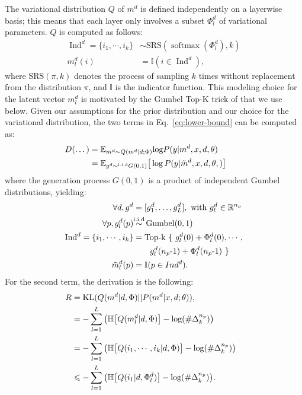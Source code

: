 \documentclass[11pt]{article}
\newcommand{\fyDone}[1]{\done[FY]\Todo[FY:]{\textcolor{orange}{#1}}}
\begin{document}
The variational distribution $Q$ of $m^d$ is defined independently on a layerwise basis; this means that each layer only involves a subset $\Phi_l^d$ of variational parameters. $Q$ is computed as follows:
\begin{align}
  \operatorname{Ind}^d = \{ i_1, \cdots, i_k \} & \sim \text{SRS}(\operatorname{softmax}(\Phi_l^d), k) \nonumber \\
  m_l^d(i) & =  \text{$\mathbb{I}$}(i \in \operatorname{Ind}^d), \nonumber
\end{align}
where $\text{SRS}(\pi,k)$ denotes the process of sampling $k$ times without replacement from the distribution $\pi$, and $\mathbb{I}$ is the indicator function. This modeling choice for the latent vector $m_l^d$ is motivated by the Gumbel Top-K trick of \citet{Kool19stochastic} that we use below.  Given our assumptions for the prior distribution and our choice for the variational distribution, the two terms in Eq.~\eqref{eq:lower-bound} can be computed as:
\begin{align}
\hspace{-2.em}
D(\dots) &= \mathbb{E}_{m^d \sim Q(m^d | d; \Phi)} \text{log} P(y | m^d, x, d, \theta) \nonumber \\
&= \mathbb{E}_{g^d \sim^{\text{i.i.d}} G(0,1)} \big[ \log P(y |\tilde{m}^d, x, d, \theta,) \big] \nonumber
\end{align}
where the generation process $G(0,1)$ is a product of independent Gumbel distributions, yielding:
\begin{align}
  \hspace{-2.em}
  \forall d,  g^d & =  [g_1^d, \dots, g_L^d],  \text{ with } g_l^d \in \mathbb{R}^{n_p} \nonumber \\
  \forall p,  g_l^d(p) & \displaystyle{\mathop{\sim}^{\text{i.i.d}}} \operatorname{Gumbel}(0,1) \nonumber \\
  \operatorname{Ind}^d = \{ i_1, \cdots, i_k \} &= \operatorname{Top-k} \ \{ \ g_l^d(0) + \Phi_l^d(0), \cdots, \nonumber \\ 
       & \quad \quad g_l^d(n_p\text{-}1) + \Phi_l^d(n_p\text{-}1) \ \}\label{eq:top-k} \\
\tilde{m}_l^d(p) &= \mathbb{I}(p \in Ind^d). \nonumber 
\end{align}
For the second term, the derivation is the following:\fyDone{Check this: we have a sum over layers ?Also: R or -R ?} 
\begin{align}
\hspace{-2.em}
  R    &= \operatorname{KL}(Q(m^d | d, \Phi)||P(m^d | x, d; \theta)), \nonumber \\ 
	&= -\sum_{l=1}^L \big(\mathbb{H} \big[ Q(m_l^d | d, \Phi) \big] - \text{log}(\#\Delta^{n_p}_k) \big) \nonumber \\ 
	&= -\sum_{l=1}^L \big(\mathbb{H} \big[ Q(i_1,\cdots,i_k | d, \Phi) \big] - \text{log}(\#\Delta^{n_p}_k) \big)\nonumber \\
	&\leqslant  -\sum_{l=1}^L \big(\mathbb{H} \big[ Q(i_1 | d, \Phi_l^d) \big] - \text{log}(\#\Delta^{n_p}_k) \big). \label{eq:entropy}
\end{align}
\end{document}
